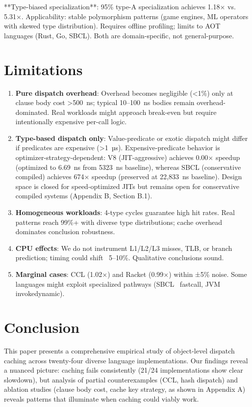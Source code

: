 \documentclass[sigplan,final,acmsmall,review,screen]{acmart}
\begin{document}
**Type-biased specialization**: 95\% type-A specialization achieves 1.18× vs. 5.31×. Applicability: stable polymorphism patterns (game engines, ML operators with skewed type distribution). Requires offline profiling; limits to AOT languages (Rust, Go, SBCL). Both are domain-specific, not general-purpose.

\section{Limitations}

\begin{enumerate}
  \item \textbf{Pure dispatch overhead}: Overhead becomes negligible (<1\%) only at clause body cost >500~ns; typical 10--100~ns bodies remain overhead-dominated. Real workloads might approach break-even but require intentionally expensive per-call logic.

  \item \textbf{Type-based dispatch only}: Value-predicate or exotic dispatch might differ if predicates are expensive (>1~µs). Expensive-predicate behavior is optimizer-strategy-dependent: V8 (JIT-aggressive) achieves 0.00× speedup (optimized to 6.69~ns from 5323~ns baseline), whereas SBCL (conservative compiled) achieves 674× speedup (preserved at 22,833~ns baseline). Design space is closed for speed-optimized JITs but remains open for conservative compiled systems (Appendix B, Section B.1).

  \item \textbf{Homogeneous workloads}: 4-type cycles guarantee high hit rates. Real patterns reach 99\%+ with diverse type distributions; cache overhead dominates conclusion robustness.

  \item \textbf{CPU effects}: We do not instrument L1/L2/L3 misses, TLB, or branch prediction; timing could shift ~5--10\%. Qualitative conclusions sound.

  \item \textbf{Marginal cases}: CCL (1.02×) and Racket (0.99×) within ±5\% noise. Some languages might exploit specialized pathways (SBCL ~fastcall, JVM invokedynamic).
\end{enumerate}

\section{Conclusion}

This paper presents a comprehensive empirical study of object-level dispatch caching across twenty-four diverse language implementations.
Our findings reveal a nuanced picture: caching fails consistently (21/24 implementations show clear slowdown), but analysis of partial
counterexamples (CCL, hash dispatch) and ablation studies (clause body cost, cache key strategy, as shown in Appendix A) reveals patterns that illuminate
when caching could viably work.
\end{document}

